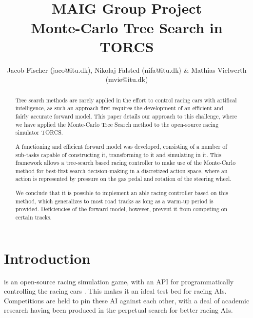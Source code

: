 \documentclass[conference]{IEEEtran}
\begin{document}
\title{\ \\ \LARGE\bf MAIG Group Project \\ Monte-Carlo Tree Search in TORCS}

\author{Jacob Fischer (jaco@itu.dk), Nikolaj Falsted (nifa@itu.dk) \& Mathias Vielwerth (mvie@itu.dk)}

\maketitle

\thispagestyle{plain}
\pagestyle{plain}

\begin{abstract}
Tree search methods are rarely applied in the effort to control racing cars with artifical intelligence, as such an approach first requires the development of an efficient and fairly accurate forward model. This paper details our approach to this challenge, where we have applied the Monte-Carlo Tree Search method to the open-source racing simulator TORCS. 

A functioning and efficient forward model was developed, consisting of a number of sub-tasks capable of constructing it, transforming to it and simulating in it. This framework allows a tree-search based racing controller to make use of the Monte-Carlo method for best-first search decision-making in a discretized action space, where an action is represented by pressure on the gas pedal and rotation of the steering wheel.

We conclude that it is possible to implement an able racing controller based on this method, which generalizes to most road tracks as long as a warm-up period is provided. Deficiencies of the forward model, however, prevent it from competing on certain tracks.
\end{abstract}

\section{Introduction}

 is an open-source racing simulation game, with an API for programmatically controlling the racing cars \cite{torcs}. This makes it an ideal test bed for racing AIs. Competitions are held to pin these AI against each other, with a deal of academic research having been produced in the perpetual search for better racing AIs.
\end{document}
